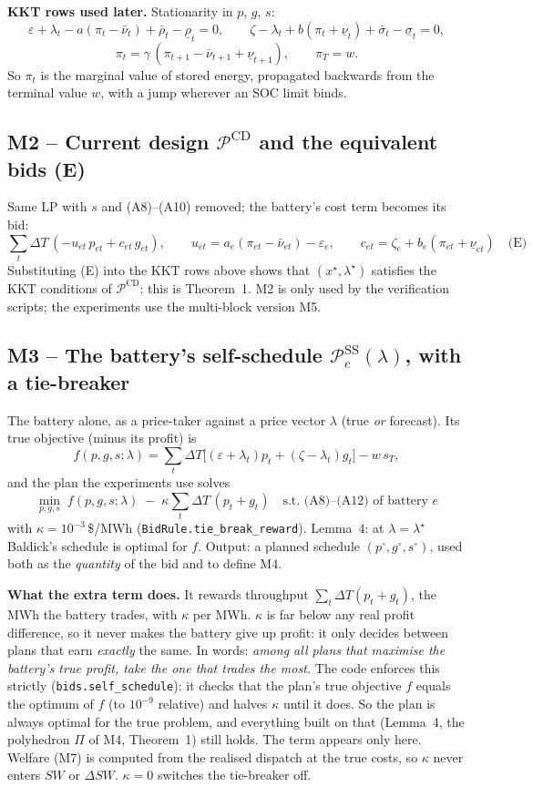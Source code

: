 \documentclass[10pt,a4paper]{article}
\newcommand{\code}[1]{\texttt{#1}}
\newcommand{\lamstar}{\lambda^{\star}}
\newcommand{\nuU}{\bar\nu}
\newcommand{\nuL}{\underline\nu}
\begin{document}
\textbf{KKT rows used later.} Stationarity in $p$, $g$, $s$:
\[
\varepsilon + \lambda_t - a(\pi_t - \nuU_t) + \bar\rho_t - \underline\rho_t = 0,\qquad
\zeta - \lambda_t + b(\pi_t + \nuL_t) + \bar\sigma_t - \underline\sigma_t = 0,
\]
\[
\pi_t = \gamma\,(\pi_{t+1} - \nuU_{t+1} + \nuL_{t+1}),\qquad \pi_T = w .
\]
So $\pi_t$ is the marginal value of stored energy, propagated backwards from the terminal value $w$, with a
jump wherever an SOC limit binds.

\subsection{M2 -- Current design $\mathcal P^{\text{CD}}$ and the equivalent bids (E)}
Same LP with $s$ and (A8)--(A10) removed; the battery's cost term becomes its bid:
\[
\textstyle\sum_t\Delta T\,(-u_{et}\,p_{et} + c_{et}\,g_{et}),\qquad
\boxed{u_{et} = a_e(\pi_{et}-\nuU_{et}) - \varepsilon_e,\qquad c_{et} = \zeta_e + b_e(\pi_{et}+\nuL_{et})}\quad\text{(E)}
\]
Substituting (E) into the KKT rows above shows that $(x^\star,\lamstar)$ satisfies the KKT conditions of
$\mathcal P^{\text{CD}}$: this is Theorem~1. M2 is only used by the verification scripts; the experiments use
the multi-block version M5.

\subsection{M3 -- The battery's self-schedule $\mathcal P^{\text{SS}}_e(\lambda)$, with a tie-breaker}
\label{sec:m3}
The battery alone, as a price-taker against a price vector $\lambda$ (true \emph{or} forecast). Its true
objective (minus its profit) is
\[
f(p,g,s;\lambda)=\sum_t \Delta T\big[(\varepsilon+\lambda_t)p_t + (\zeta-\lambda_t)g_t\big] - w\,s_T ,
\]
and the plan the experiments use solves
\[
\boxed{\;\min_{p,g,s}\; f(p,g,s;\lambda)\;-\;\kappa\sum_t \Delta T\,(p_t+g_t)
\quad\text{s.t. (A8)--(A12) of battery } e\;}
\]
with $\kappa=10^{-3}$\,\$/MWh (\code{BidRule.tie\_break\_reward}).
Lemma~4: at $\lambda=\lamstar$ Baldick's schedule is optimal for $f$. Output: a planned schedule
$(p^\circ, g^\circ, s^\circ)$, used both as the \emph{quantity} of the bid and to define M4.

\textbf{What the extra term does.} It rewards throughput $\sum_t\Delta T(p_t+g_t)$, the MWh the battery
trades, with $\kappa$ per MWh. $\kappa$ is far below any real profit difference, so it never makes the battery
give up profit: it only decides between plans that earn \emph{exactly} the same. In words: \emph{among all
plans that maximise the battery's true profit, take the one that trades the most.} The code enforces this
strictly (\code{bids.self\_schedule}): it checks that the plan's true objective $f$ equals the optimum of
$f$ (to $10^{-9}$ relative) and halves $\kappa$ until it does. So the plan is always optimal for the true
problem, and everything built on that (Lemma~4, the polyhedron $\Pi$ of M4, Theorem~1) still holds. The term
appears only here. Welfare (M7) is computed from the realised dispatch at the true costs, so $\kappa$ never
enters $SW$ or $\Delta SW$. $\kappa=0$ switches the tie-breaker off.
\end{document}
